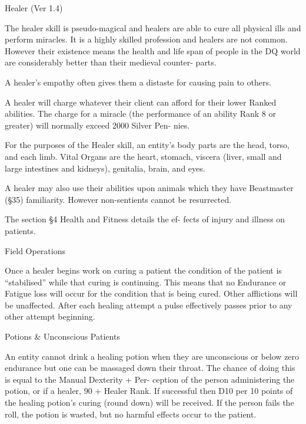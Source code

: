 \begin{Chapter}{Healer (Ver 1.4)}

The  healer  skill  is  pseudo-magical  and healers  are 
able to cure all physical ills and perform miracles. 
It is a highly skilled profession and healers are not 
common.  However  their  existence  means  the 
health and life span of people in the DQ world are 
considerably  better  than  their  medieval  counter-
parts. 

A healer’s empathy often gives them a distaste for 
causing pain to others. 

A  healer  will  charge  whatever  their  client  can 
afford for their lower Ranked abilities. The charge 
for a miracle (the performance of an ability Rank 8 
or  greater)  will  normally  exceed  2000  Silver  Pen-
nies. 

For  the  purposes  of  the  Healer  skill,  an  entity’s 
body parts are the head, torso, and each limb. Vital 
Organs are the heart, stomach, viscera (liver, small 
and  large  intestines  and  kidneys),  genitalia,  brain, 
and eyes. 

A  healer  may  also  use  their  abilities  upon  animals 
which  they  have  Beastmaster  (§35)  familiarity. 
However non-sentients cannot be resurrected. 

The  section  §4  Health  and  Fitness  details  the  ef-
fects of injury and illness on patients. 

Field Operations 

Once  a healer  begins  work  on  curing  a patient  the 
condition  of  the  patient  is  “stabilised”  while  that 
curing is continuing. This means that no Endurance 
or  Fatigue  loss  will  occur  for  the  condition  that  is 
being  cured.  Other  afflictions  will  be  unaffected. 
After  each  healing  attempt  a  pulse  effectively 
passes prior to any other attempt beginning. 

Potions \& Unconscious Patients 

An entity cannot drink a healing potion when they 
are  unconscious  or  below  zero  endurance  but  one 
can be massaged down their throat. The chance of 
doing  this  is  equal  to  the Manual  Dexterity  +  Per-
ception of the person administering the potion, or if 
a healer, 90 + Healer Rank. If successful then D10 
per 10 points of the healing potion’s curing (round 
down) will be received. If the person fails the roll, 
the  potion  is  wasted,  but  no  harmful  effects  occur 
to the patient. 


\end{Chapter}
